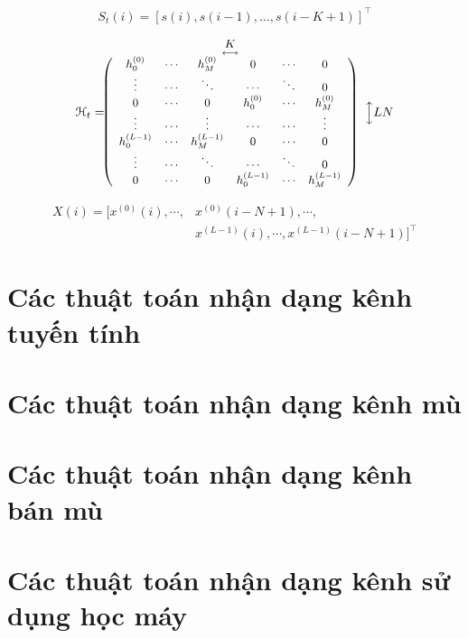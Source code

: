 \begin{equation*}
    S_t(i) = [s(i), s(i-1),\ldots,s(i-K+1)]^\top
\end{equation*}

\begin{equation*}
    \small
    \mathcal{H}_t= \hspace{-0.7cm}
    \begin{array}{cc}
         & \underset{\longleftrightarrow}{K}\\
         & \left(\begin{array}{cccccc}
    h_0^{(0)} & \cdots & h_M^{(0)} & 0 & \cdots & 0 \\
    \vdots & \cdots & \ddots & \cdots & \ddots & 0 \\
    0 & \cdots & 0 & h_0^{(0)} & \cdots & h_M^{(0)} \\
    \vdots & \cdots & \vdots & \cdots & \cdots & \vdots \\
    h_0^{(L-1)} & \cdots & h_M^{(L-1)} & 0 & \cdots & 0 \\
    \vdots & \cdots & \ddots & \cdots & \ddots & 0 \\
    0 & \cdots & 0 & h_0^{(L-1)} & \cdots & h_M^{(L-1)}
    \end{array}
    \right) 
    \end{array}
    \Big\updownarrow LN    
\end{equation*}

\begin{equation*}
    \begin{aligned}
        X(i) = \big[x^{(0)}(i), \cdots, &x^{(0)}(i-N+1), \cdots, 
        \\ &x^{(L-1)}(i), \cdots, x^{(L-1)}(i-N+1)\big]^\top
    \end{aligned}
\end{equation*} 

\section{Các thuật toán nhận dạng kênh tuyến tính}

\section{Các thuật toán nhận dạng kênh mù}

\section{Các thuật toán nhận dạng kênh bán mù}

\section{Các thuật toán nhận dạng kênh sử dụng học máy}
